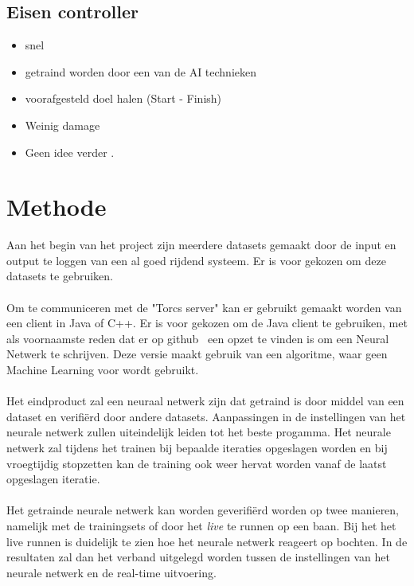 \documentclass{article}
\begin{document}
\subsection*{Eisen controller}
\begin{itemize}
\item snel
\item getraind worden door een van de AI technieken
\item voorafgesteld doel halen (Start - Finish)
\item Weinig damage
\item Geen idee verder
.
\end{itemize}

\pagebreak


\section{Methode}
Aan het begin van het project zijn meerdere datasets gemaakt door de input en output te loggen van een al goed rijdend systeem. Er is voor gekozen om deze datasets te gebruiken. \\\\ 
Om te communiceren met de "Torcs server" kan er gebruikt gemaakt worden van een client in Java of C++. Er is voor gekozen om de Java client te gebruiken, met als voornaamste reden dat er op github~\cite{java-client} een opzet te vinden is om een Neural Netwerk te schrijven. Deze versie maakt gebruik van een algoritme, waar geen Machine Learning voor wordt gebruikt. \\\\
Het eindproduct zal een neuraal netwerk zijn dat getraind is door middel van een dataset en verifi\"erd door andere datasets. Aanpassingen in de instellingen van het neurale netwerk zullen uiteindelijk leiden tot het beste progamma. Het neurale netwerk zal tijdens het trainen bij bepaalde iteraties opgeslagen worden en bij vroegtijdig stopzetten kan de training ook weer hervat worden vanaf de laatst opgeslagen iteratie. \\\\
Het getrainde neurale netwerk kan worden geverifi\"erd worden op twee manieren, namelijk met de trainingsets of door het \textit{live} te runnen op een baan. Bij het het live runnen is duidelijk te zien hoe het neurale netwerk reageert op bochten. In de resultaten zal dan het verband uitgelegd worden tussen de instellingen van het neurale netwerk en de real-time uitvoering. 
\pagebreak

\pagebreak
\end{document}
